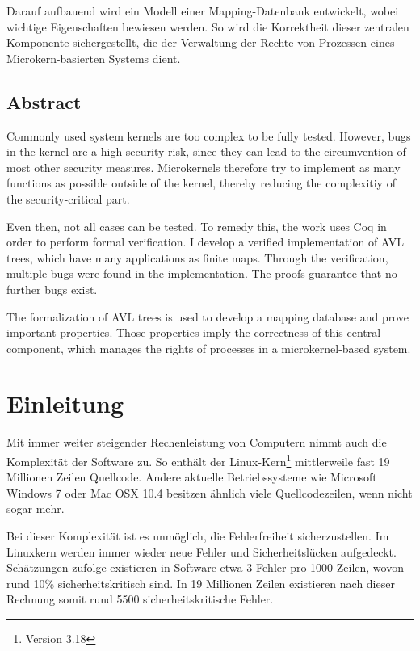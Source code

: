 \documentclass[a4paper, parskip]{scrartcl}
\begin{document}
Darauf aufbauend wird ein Modell einer Mapping-Datenbank entwickelt, wobei wichtige Eigenschaften bewiesen werden.
So wird die Korrektheit dieser zentralen Komponente sichergestellt, die der Verwaltung der Rechte von Prozessen eines Microkern-basierten Systems dient.
\bigskip\bigskip


\subsection*{Abstract}
Commonly used system kernels are too complex to be fully tested.
However, bugs in the kernel are a high security risk, since they can lead to the circumvention of most other security measures.
Microkernels therefore try to implement as many functions as possible outside of the kernel, thereby reducing the complexitiy of the security-critical part.

Even then, not all cases can be tested.
To remedy this, the work uses Coq in order to perform formal verification.
I develop a verified implementation of AVL trees, which have many applications as finite maps.
Through the verification, multiple bugs were found in the implementation.
The proofs guarantee that no further bugs exist.

The formalization of AVL trees is used to develop a mapping database and prove important properties.
Those properties imply the correctness of this central component, which manages the rights of processes in a microkernel-based system.
\cleardoublepage

\pagestyle{plain}
\setcounter{page}{1}
\tableofcontents{}
\newpage

\section{Einleitung}
Mit immer weiter steigender Rechenleistung von Computern nimmt auch die Komplexität der Software zu. 
So enthält der Linux-Kern\footnote{Version 3.18} mittlerweile fast 19 Millionen Zeilen Quellcode.\autocite{linux-dev}
Andere aktuelle Betriebssysteme wie Microsoft Windows 7 oder Mac OSX 10.4 besitzen ähnlich viele Quellcodezeilen, wenn nicht sogar mehr.\autocite{common-loc}

Bei dieser Komplexität ist es unmöglich, die Fehlerfreiheit sicherzustellen.
Im Linuxkern werden immer wieder neue Fehler und Sicherheitslücken aufgedeckt.
Schätzungen zufolge existieren in Software etwa 3 Fehler pro 1000 Zeilen, wovon rund 10\% sicherheitskritisch sind.
In 19 Millionen Zeilen existieren nach dieser Rechnung somit rund 5500 sicherheitskritische Fehler.
\end{document}
